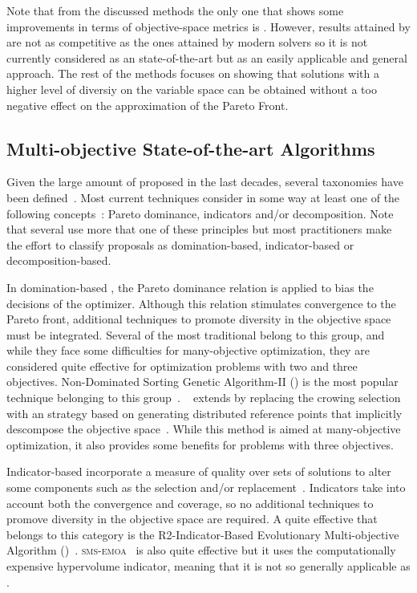 Note that from the discussed methods the only one that shows some improvements in terms of objective-space metrics is \GDEA{}.
%
However, results attained by \GDEA{} are not as competitive as the ones attained by modern solvers so it is not currently
considered as an state-of-the-art \MOEA{} but as an easily applicable and general approach.
%
The rest of the methods focuses on showing that solutions with a higher level of diversiy on the variable space
can be obtained without a too negative effect
on the approximation of the Pareto Front.


\subsection{Multi-objective State-of-the-art Algorithms}

Given the large amount of \MOEAS{} proposed in the last decades, several taxonomies have been defined~\cite{bechikh2016recent}.
%
Most current techniques consider in some way at least one of the following concepts~\cite{trivedi2016survey}:
Pareto dominance, indicators and/or decomposition.
%
Note that several \MOEAS{} use more that one of these principles but most practitioners make the effort to classify
proposals as domination-based, indicator-based or decomposition-based.

In domination-based \MOEAS{}, the Pareto dominance relation is applied to bias the decisions of the optimizer.
%
Although this relation stimulates convergence to the Pareto front, additional techniques to promote
diversity in the objective space must be integrated.
%
Several of the most traditional \MOEAS{} belong to this group, and while they face some difficulties for many-objective
optimization, they are considered quite effective for optimization problems with two and three objectives.
%
Non-Dominated Sorting Genetic Algorithm-II (\NSGAII{}) is the most popular technique belonging to this group~\cite{deb2002fast}.
%
\NSGAIII{}~\cite{deb2013evolutionary} extends \NSGAII{} by replacing the crowing selection with an strategy 
based on generating distributed reference points that implicitly descompose the objective space~\cite{trivedi2016survey}.
%
While this method is aimed at many-objective optimization, it also provides some benefits for problems with three objectives.

Indicator-based \MOEAS{} incorporate a measure of quality over sets of solutions to alter some components such as the 
selection and/or replacement~\cite{beume2007sms}.
%
Indicators take into account both the convergence and coverage, so no additional techniques to promove diversity
in the objective space are required.
%
A quite effective \MOEA{} that belongs to this category is the R2-Indicator-Based Evolutionary Multi-objective 
Algorithm (\RMOEA{})~\cite{trautmann2013r2}.
%
\textsc{sms-emoa}~\cite{Joel:SMSEMOA} is also quite effective 
but it uses the computationally expensive hypervolume indicator, meaning that it is not so generally applicable as \RMOEA{}.

